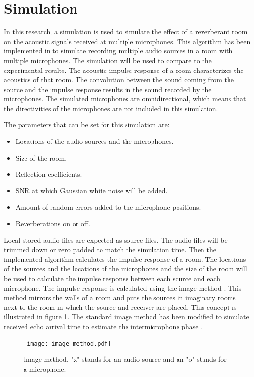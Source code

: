 \section{Simulation}
\label{sec:des_simulation}

In this research, a simulation is used to simulate the effect of a reverberant room on the acoustic signals received at multiple microphones. This algorithm has been implemented in \matlab to simulate recording multiple audio sources in a room with multiple microphones. The simulation will be used to compare to the experimental results. The acoustic impulse response of a room characterizes the acoustics of that room. The convolution between the sound coming from the source and the impulse response results in the sound recorded by the microphones. The simulated microphones are omnidirectional, which means that the directivities of the microphones are not included in this simulation.

The parameters that can be set for this simulation are:

\begin{itemize}
\item Locations of the audio sources and the microphones. 
\item Size of the room.
\item Reflection coefficients.
\item SNR at which Gaussian white noise will be added.
\item Amount of random errors added to the microphone positions.
\item Reverberations on or off.
\end{itemize} 

Local stored audio files are expected as source files. The audio files will be trimmed down or zero padded to match the simulation time. Then the implemented algorithm calculates the impulse response of a room. The locations of the sources and the locations of the microphones and the size of the room will be used to calculate the impulse response between each source and each microphone. The impulse response is calculated using the image method \cite{allen1979}. This method mirrors the walls of a room and puts the sources in imaginary rooms next to the room in which the source and receiver are placed. This concept is illustrated in figure \ref{fig:image_method}. The standard image method has been modified to simulate received echo arrival time to estimate the intermicrophone phase \cite{peterson1986}.

\begin{figure} [h]
    \centering
       \texttt{[image: image\_method.pdf]} %
    \caption[Image method for simulating a rooms \cite{allen1979}]{Image method, "x" stands for an audio source and an "o" stands for a microphone. \cite{allen1979}}
    \label{fig:image_method}
\end{figure}

